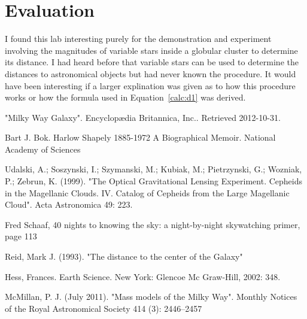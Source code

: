 \documentclass{article}
\begin{document}

\section{Evaluation}

I found this lab interesting purely for the demonstration and experiment involving
the magnitudes of variable stars inside a globular cluster to determine its distance.
I had heard before that variable stars can be used to determine the distances to
astronomical objects but had never known the procedure. It would have been interesting
if a larger explination was given as to how this procedure works or how the formula
used in Equation~\ref{calc:d1} was derived.



\begin{thebibliography}{9}

"Milky Way Galaxy". Encyclopædia Britannica, Inc.. Retrieved 2012-10-31.

Bart J. Bok. Harlow Shapely 1885-1972 A Biographical Memoir. National Academy of Sciences

Udalski, A.; Soszynski, I.; Szymanski, M.; Kubiak, M.; Pietrzynski, G.; Wozniak, P.; Zebrun, K. (1999). "The Optical Gravitational Lensing Experiment. Cepheids in the Magellanic Clouds. IV. Catalog of Cepheids from the Large Magellanic Cloud". Acta Astronomica 49: 223.

Fred Schaaf, 40 nights to knowing the sky: a night-by-night skywatching primer, page 113

Reid, Mark J. (1993). "The distance to the center of the Galaxy"

Hess, Frances. Earth Science. New York: Glencoe Mc Graw-Hill, 2002: 348.

McMillan, P. J. (July 2011). "Mass models of the Milky Way". Monthly Notices of the Royal Astronomical Society 414 (3): 2446–2457

\end{thebibliography}
\end{document}
